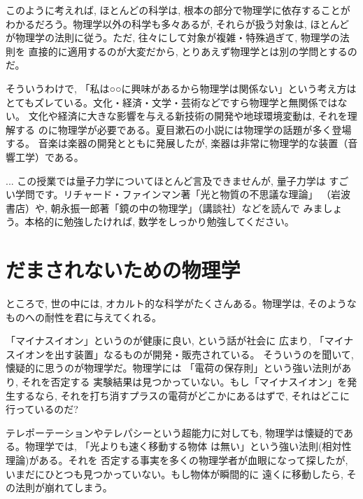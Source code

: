 このように考えれば, ほとんどの科学は, 根本の部分で物理学に依存することが
わかるだろう。物理学以外の科学も多々あるが, それらが扱う対象は, ほとんど
が物理学の法則に従う。ただ, 往々にして対象が複雑・特殊過ぎて, 物理学の法則を
直接的に適用するのが大変だから, とりあえず物理学とは別の学問とするのだ。

そういうわけで, 「私は○○に興味があるから物理学は関係ない」という考え方は
とてもズレている。文化・経済・文学・芸術などですら物理学と無関係ではない。
文化や経済に大きな影響を与える新技術の開発や地球環境変動は, それを理解する
のに物理学が必要である。夏目漱石の小説には物理学の話題が多く登場する。
音楽は楽器の開発とともに発展したが, 楽器は非常に物理学的な装置（音響工学）である。\mv

\begin{faq}{\small{}
... この授業では量子力学についてほとんど言及できませんが, 量子力学は
すごい学問です。リチャード・ファインマン著「光と物質の不思議な理論」
（岩波書店）や, 朝永振一郎著「鏡の中の物理学」（講談社）などを読んで
みましょう。本格的に勉強したければ, 数学をしっかり勉強してください。}\end{faq}
\hv


\section{だまされないための物理学}

ところで, 世の中には, オカルト的な科学がたくさんある。物理学は, 
そのようなものへの耐性を君に与えてくれる。

\begin{exmpl} 「マイナスイオン」というのが健康に良い, という話が社会に
広まり, 「マイナスイオンを出す装置」なるものが開発・販売されている。
そういうのを聞いて, 懐疑的に思うのが物理学だ。物理学には
「電荷の保存則」という強い法則があり, それを否定する
実験結果は見つかっていない。もし「マイナスイオン」を発生するなら, 
それを打ち消すプラスの電荷がどこかにあるはずで, それはどこに
行っているのだ?
\end{exmpl}

\begin{exmpl}テレポーテーションやテレパシーという超能力に対しても, 
物理学は懐疑的である。物理学では, 「光よりも速く移動する物体
は無い」という強い法則(相対性理論)がある。それを
否定する事実を多くの物理学者が血眼になって探したが, 
いまだにひとつも見つかっていない。もし物体が瞬間的に
遠くに移動したら, その法則が崩れてしまう。\end{exmpl}

